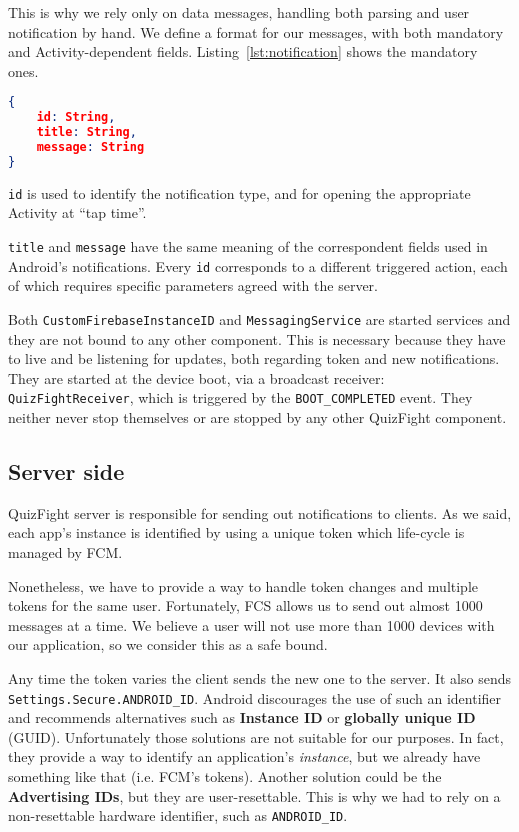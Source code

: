 This is why we rely only on data messages, handling both parsing and user
notification by hand.
We define a format for our messages, with both mandatory and Activity-dependent
fields. Listing~\ref{lst:notification} shows the mandatory ones.

\begin{lstlisting}[language=json, caption={Mandatory fields for a notification}, label={lst:notification}]
{
	id: String,
	title: String,
	message: String
}
\end{lstlisting}

\texttt{id} is used to identify the notification type, and for opening the
appropriate Activity at ``tap time''.

\texttt{title} and \texttt{message} have the same meaning of the correspondent
fields used in Android's notifications.
Every \texttt{id} corresponds to a different triggered action, each of which
requires specific parameters agreed with the server.

Both \texttt{CustomFirebaseInstanceID} and \texttt{MessagingService} are
started services and they are not bound to any other component.
This is necessary because they have to live and be listening for updates,
both regarding token and new notifications.
They are started at the device boot, via a broadcast receiver: 
\texttt{QuizFightReceiver}, which is triggered by the \texttt{BOOT\_COMPLETED}
event.
They neither never stop themselves or are stopped by any other QuizFight
component. 

\subsection{Server side}
QuizFight server is responsible for sending out notifications to clients.
As we said, each app's instance is identified by using a unique token which
life-cycle is managed by FCM.

Nonetheless, we have to provide a way to handle token changes and multiple
tokens for the same user. Fortunately, FCS allows us to send out almost 1000
messages at a time.
We believe a user will not use more than 1000 devices with our application,
so we consider this as a safe bound.

Any time the token varies the client sends the new one to the server.
It also sends \texttt{Settings.Secure.ANDROID\_ID}.
Android discourages the use of such an identifier and recommends
alternatives such as \textbf{Instance ID} or \textbf{globally unique ID} (GUID).
Unfortunately those solutions are not suitable for our purposes.
In fact, they provide a way to identify an application's \textit{instance}, but
we already have something like that (i.e. FCM's tokens).
Another solution could be the \textbf{Advertising IDs}, but they are
user-resettable.
This is why we had to rely on a non-resettable hardware identifier, such as
\texttt{ANDROID\_ID}.

